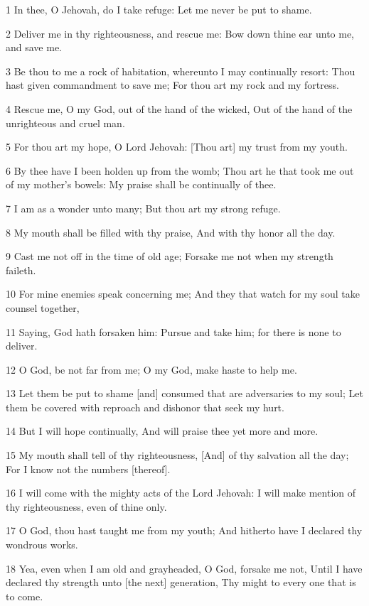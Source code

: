 \par 1 In thee, O Jehovah, do I take refuge: Let me never be put to shame.
\par 2 Deliver me in thy righteousness, and rescue me: Bow down thine ear unto me, and save me.
\par 3 Be thou to me a rock of habitation, whereunto I may continually resort: Thou hast given commandment to save me; For thou art my rock and my fortress.
\par 4 Rescue me, O my God, out of the hand of the wicked, Out of the hand of the unrighteous and cruel man.
\par 5 For thou art my hope, O Lord Jehovah: [Thou art] my trust from my youth.
\par 6 By thee have I been holden up from the womb; Thou art he that took me out of my mother's bowels: My praise shall be continually of thee.
\par 7 I am as a wonder unto many; But thou art my strong refuge.
\par 8 My mouth shall be filled with thy praise, And with thy honor all the day.
\par 9 Cast me not off in the time of old age; Forsake me not when my strength faileth.
\par 10 For mine enemies speak concerning me; And they that watch for my soul take counsel together,
\par 11 Saying, God hath forsaken him: Pursue and take him; for there is none to deliver.
\par 12 O God, be not far from me; O my God, make haste to help me.
\par 13 Let them be put to shame [and] consumed that are adversaries to my soul; Let them be covered with reproach and dishonor that seek my hurt.
\par 14 But I will hope continually, And will praise thee yet more and more.
\par 15 My mouth shall tell of thy righteousness, [And] of thy salvation all the day; For I know not the numbers [thereof].
\par 16 I will come with the mighty acts of the Lord Jehovah: I will make mention of thy righteousness, even of thine only.
\par 17 O God, thou hast taught me from my youth; And hitherto have I declared thy wondrous works.
\par 18 Yea, even when I am old and grayheaded, O God, forsake me not, Until I have declared thy strength unto [the next] generation, Thy might to every one that is to come.
